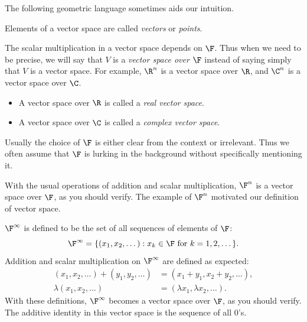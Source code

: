 The following geometric language sometimes aids our intuition.

\begin{definition}\label{ax:1.21}
Elements of a vector space are called \emph{vectors} or \emph{points}.
\end{definition}

The scalar multiplication in a vector space depends on $\F$. Thus when we need
to be precise, we will say that $V$ is a \emph{vector space over} $\F$ instead
of saying simply that $V$ is a vector space. For example, $\R^n$ is a vector
space over $\R$, and $\C^n$ is a vector space over $\C$.

\begin{definition}\label{ax:1.22}\leavevmode
\begin{itemize}
\item A vector space over $\R$ is called a \emph{real vector space}.
\item A vector space over $\C$ is called a \emph{complex vector space}.
\end{itemize}
\end{definition}

Usually the choice of $\F$ is either clear from the context or irrelevant. Thus
we often assume that $\F$ is lurking in the background without specifically
mentioning it.

%
With the usual operations of addition and scalar multiplication, $\F^n$ is a
vector space over $\F$, as you should verify. The example of $\F^n$ motivated
our definition of vector space.

\begin{example}[$\F^\infty$]\label{ax:1.23}
$\F^\infty$ is defined to be the set of all sequences of elements of $\F$:
\[ \F^\infty = \{(x_1,x_2,\dots) : x_k\in\F \text{ for } k=1,2,\dots\}. \]
Addition and scalar multiplication on $\F^\infty$ are defined as expected:
\begin{align*}
(x_1,x_2,\dots)+(y_1,y_2,\dots) &= (x_1+y_1,x_2+y_2,\dots),\\
\lambda(x_1,x_2,\dots) &= (\lambda x_1,\lambda x_2,\dots).
\end{align*}
With these definitions, $\F^\infty$ becomes a vector space over $\F$, as you
should verify. The additive identity in this vector space is the sequence of
all $0$'s.
\end{example}

